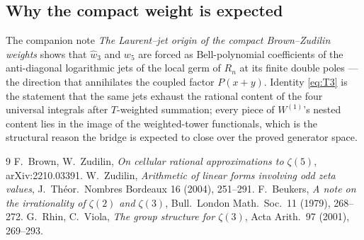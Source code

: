 \documentclass[11pt]{article}
\theoremstyle{remark}
\begin{document}
\subsection{Why the compact weight is expected}
The companion note \emph{The Laurent--jet origin of the compact
Brown--Zudilin weights} shows that $\hat w_3$ and $w_5$ are forced as
Bell-polynomial coefficients of the anti-diagonal logarithmic jets of the
local germ of $R_n$ at its finite double poles --- the direction that
annihilates the coupled factor $P(x+y)$.  Identity \eqref{eq:T3} is the
statement that the same jets exhaust the rational content of the four
universal integrals after $T$-weighted summation; every piece of
$W^{(1)}$'s nested content lies in the image of the weighted-tower
functionals, which is the structural reason the bridge is expected to close
over the proved generator space.

\begin{thebibliography}{9}
 F.~Brown, W.~Zudilin,
\emph{On cellular rational approximations to $\zeta(5)$},
arXiv:2210.03391.
 W.~Zudilin,
\emph{Arithmetic of linear forms involving odd zeta values},
J.\ Th\'eor.\ Nombres Bordeaux 16 (2004), 251--291.
 F.~Beukers, \emph{A note on the irrationality of $\zeta(2)$
and $\zeta(3)$}, Bull.\ London Math.\ Soc.\ 11 (1979), 268--272.
 G.~Rhin, C.~Viola, \emph{The group structure for $\zeta(3)$},
Acta Arith.\ 97 (2001), 269--293.
\end{thebibliography}
\end{document}

